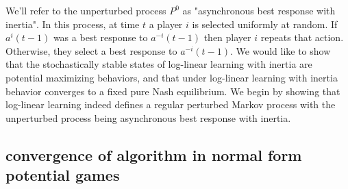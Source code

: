 We'll refer to the unperturbed process $P^0$ as "asynchronous best response with inertia". In this process, at time $t$ a player $i$ is selected uniformly at random. If $a^i(t-1)$ was a best response to $a^{-i}(t-1)$ then player $i$ repeats that action. Otherwise, they select a best response to $a^{-i}(t-1)$. We would like to show that the stochastically stable states of log-linear learning with inertia are potential maximizing behaviors, and that under log-linear learning with inertia behavior converges to a fixed pure Nash equilibrium. We begin by showing that log-linear learning indeed defines a regular perturbed Markov process with the unperturbed process being asynchronous best response with inertia.









\subsection{convergence of algorithm in normal form potential games}

